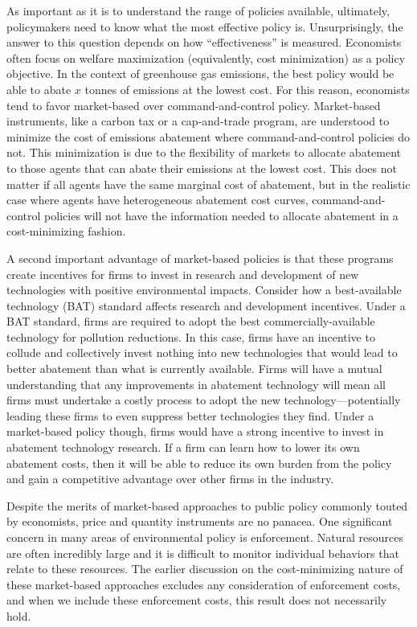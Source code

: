 As important as it is to understand the range of policies available, ultimately, policymakers need to know what the most effective policy is. Unsurprisingly, the answer to this question depends on how ``effectiveness'' is measured. Economists often focus on welfare maximization (equivalently, cost minimization) as a policy objective. In the context of greenhouse gas emissions, the best policy would be able to abate $x$ tonnes of emissions at the lowest cost. For this reason, economists tend to favor market-based over command-and-control policy. Market-based instruments, like a carbon tax or a cap-and-trade program, are understood to minimize the cost of emissions abatement where command-and-control policies do not. This minimization is due to the flexibility of markets to allocate abatement to those agents that can abate their emissions at the lowest cost. This does not matter if all agents have the same marginal cost of abatement, but in the realistic case where agents have heterogeneous abatement cost curves, command-and-control policies will not have the information needed to allocate abatement in a cost-minimizing fashion. 

A second important advantage of market-based policies is that these programs create incentives for firms to invest in research and development of new technologies with positive environmental impacts. Consider how a best-available technology (BAT) standard affects research and development incentives. Under a BAT standard, firms are required to adopt the best commercially-available technology for pollution reductions. In this case, firms have an incentive to collude and collectively invest nothing into new technologies that would lead to better abatement than what is currently available. Firms will have a mutual understanding that any improvements in abatement technology will mean all firms must undertake a costly process to adopt the new technology---potentially leading these firms to even suppress better technologies they find. Under a market-based policy though, firms would have a strong incentive to invest in abatement technology research. If a firm can learn how to lower its own abatement costs, then it will be able to reduce its own burden from the policy and gain a competitive advantage over other firms in the industry.

Despite the merits of market-based approaches to public policy commonly touted by economists, price and quantity instruments are no panacea. One significant concern in many areas of environmental policy is enforcement. Natural resources are often incredibly large and it is difficult to monitor individual behaviors that relate to these resources. The earlier discussion on the cost-minimizing nature of these market-based approaches excludes any consideration of enforcement costs, and when we include these enforcement costs, this result does not necessarily hold. 

